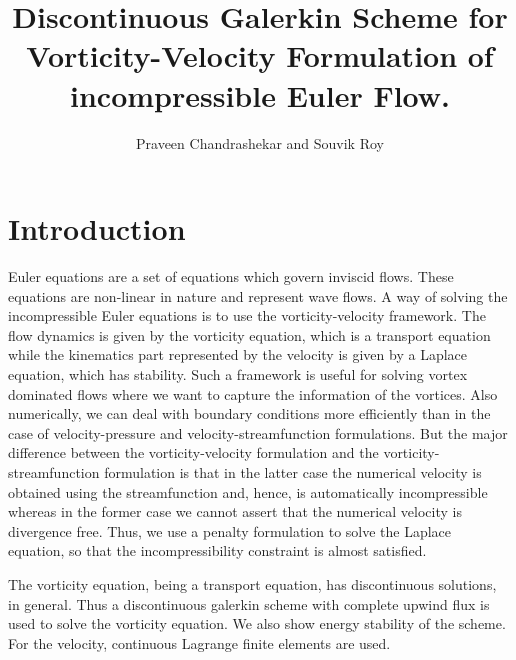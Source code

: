 \documentclass[11pt]{article}
\begin{document}
\title{Discontinuous Galerkin Scheme for Vorticity-Velocity Formulation of incompressible Euler Flow. }
\author{  Praveen Chandrashekar and Souvik Roy}


\maketitle

\section{Introduction}

\par Euler equations are a set of equations which govern inviscid flows. These equations are non-linear in nature and represent wave flows. 
A way of solving the incompressible Euler equations is to use the vorticity-velocity framework. The flow dynamics is given by the vorticity equation, which is a 
transport equation while the kinematics part represented by the velocity is given by a Laplace equation, which has stability. Such a framework 
is useful for solving vortex dominated flows where we want to capture the information of the vortices. Also numerically, we can deal with boundary 
conditions more efficiently than in the case of velocity-pressure and velocity-streamfunction formulations. But the major difference between the vorticity-velocity formulation and the vorticity-streamfunction formulation is that in the latter case the numerical velocity is obtained using the streamfunction and, hence, is automatically incompressible whereas in the former case we cannot assert that the numerical velocity is divergence free. Thus, we use a penalty formulation to solve the Laplace equation, so that the incompressibility constraint is almost satisfied.

The vorticity equation, being a transport equation, has  discontinuous solutions, in general. Thus a discontinuous galerkin scheme with complete upwind flux is used to solve the vorticity equation. We also show energy stability of the scheme. For the velocity, continuous Lagrange finite elements are used.
\end{document}
